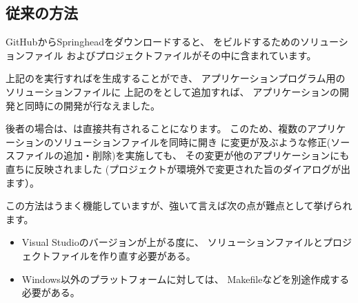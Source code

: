 \subsection{従来の方法}
\label{subsec:ConventionalMethod}

\noindent
GitHubからSpringheadをダウンロードすると、
\SprLib をビルドするためのソリューションファイル
およびプロジェクトファイルがその中に含まれています。

\medskip
\begin{narrow}
    \begin{narrow}[20pt]\begin{minipage}{\textwidth}
	{\footnotesize{}}
	\medskip
  \end{minipage}\end{narrow}
\end{narrow}

上記の\SolutionFile を実行すれば\SprLib を生成することができ、
アプリケーションプログラム用のソリューションファイルに
上記の\ProjectFile をとして追加すれば、
アプリケーションの開発と同時に\SprLib の開発が行なえました。

後者の場合は、\ProjectFile は直接共有されることになります。
このため、複数のアプリケーションのソリューションファイルを同時に開き
\ProjectFile に変更が及ぶような修正(ソースファイルの追加・削除)を実施しても、
その変更が他のアプリケーションにも直ちに反映されました
(プロジェクトが環境外で変更された旨のダイアログが出ます）。

\medskip
この方法はうまく機能していますが、強いて言えば次の点が難点として挙げられます。
\begin{itemize}
  \item	Visual Studioのバージョンが上がる度に、
	ソリューションファイルとプロジェクトファイルを作り直す必要がある。
  \item	Windows以外のプラットフォームに対しては、
	Makefileなどを別途作成する必要がある。
\end{itemize}

